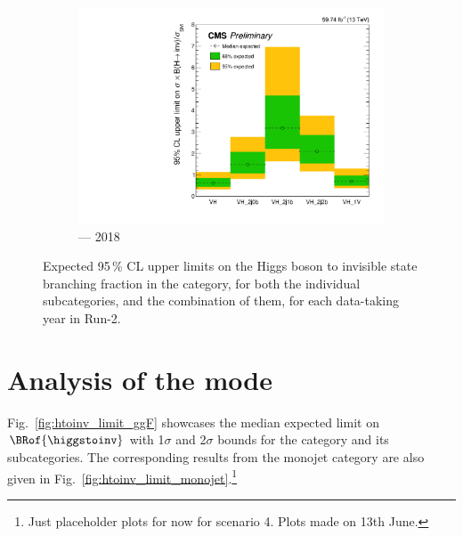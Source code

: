 \begin{figure}[htbp]
    \begin{subfigure}[b]{0.45\textwidth}
        \includegraphics[width=\textwidth]{figures/limits/VH/limit_2018_VH_Scenario4.pdf}
        \caption{\VH --- 2018}
    \end{subfigure}
    \caption[Expected 95\,\% CL upper limits on the Higgs boson to invisible state branching fraction in the \VH category, for both the individual subcategories, and the combination of them, for each data-taking year in Run-2]{Expected 95\,\% CL upper limits on the Higgs boson to invisible state branching fraction in the \VH category, for both the individual subcategories, and the combination of them, for each data-taking year in Run-2.}
    \label{fig:htoinv_limit_VH}
\end{figure}




\section{Analysis of the \texorpdfstring{\ggH}{ggH} mode}
\label{sec:htoinv_analysis_ggF}


Fig.~\ref{fig:htoinv_limit_ggF} showcases the median expected limit on $\BRof{\higgstoinv}$ with 1$\sigma$ and 2$\sigma$ bounds for the \ggH category and its subcategories. The corresponding results from the monojet category are also given in Fig.~\ref{fig:htoinv_limit_monojet}.\footnote{Just placeholder plots for now for scenario 4. Plots made on 13th June.}

